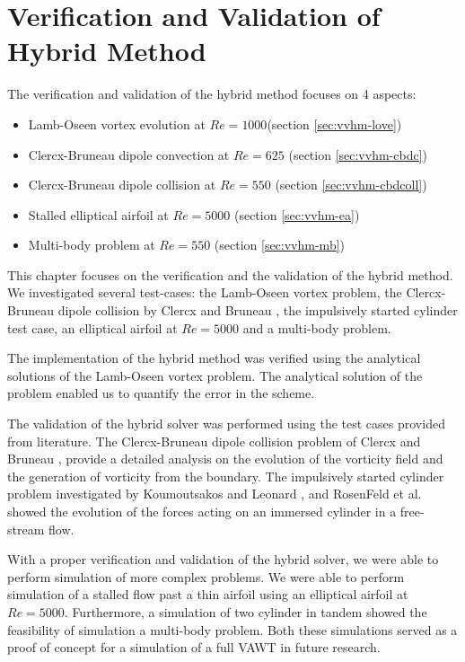 \chapter{Verification and Validation of Hybrid Method}
\label{ch:vavohm}

The verification and validation of the hybrid method focuses on 4 aspects:
\begin{itemize}
\item Lamb-Oseen vortex evolution at $Re=1000$(section \ref{sec:vvhm-love})
\item Clercx-Bruneau dipole convection at $Re=625$ (section \ref{sec:vvhm-cbdc})
\item Clercx-Bruneau dipole collision at $Re=550$ (section \ref{sec:vvhm-cbdcoll})
\item Stalled elliptical airfoil at $Re=5000$ (section \ref{sec:vvhm-ea})
\item Multi-body problem at $Re=550$ (section \ref{sec:vvhm-mb})
\end{itemize}

This chapter focuses on the verification and the validation of the hybrid method. We investigated several test-cases: the Lamb-Oseen vortex problem, the Clercx-Bruneau dipole collision by Clercx and Bruneau \cite{Clercx2006a}, the impulsively started cylinder test case, an elliptical airfoil at $Re=5000$ and a multi-body problem.

The implementation of the hybrid method was verified using the analytical solutions of the Lamb-Oseen vortex problem. The analytical solution of the problem enabled us to quantify the error in the scheme.

The validation of the hybrid solver was performed using the test cases provided from literature. The Clercx-Bruneau dipole collision problem of Clercx and Bruneau \cite{Clercx2006a}, provide a detailed analysis on the evolution of the vorticity field and the generation of vorticity from the boundary. The impulsively started cylinder problem investigated by Koumoutsakos and Leonard \cite{Koumoutsakos1995a}, and RosenFeld et al. \cite{MosheRosenFeldDochanKwak1991} showed the evolution of the forces acting on an immersed cylinder in a free-stream flow.

With a proper verification and validation of the hybrid solver, we were able to perform simulation of more complex problems. We were able to perform simulation of a stalled flow past a thin airfoil using an elliptical airfoil at $Re=5000$. Furthermore, a simulation of two cylinder in tandem showed the feasibility of simulation a multi-body problem. Both these simulations served as a proof of concept for a simulation of a full VAWT in future research.


